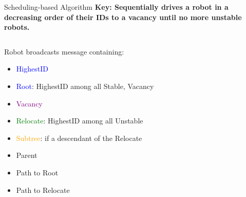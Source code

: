 \begin{frame}{Scheduling-based Algorithm}
  \textbf{\small{Key: Sequentially drives a robot in a decreasing order of their IDs to a vacancy until no more unstable robots.}}
  \begin{columns}[T] %
    \begin{column}{.5\textwidth}
      \small{
        Robot broadcasts message containing:
        \begin{itemize}
        \item \textcolor{blue}{HighestID} 
        \item \textcolor{blue}{Root}: HighestID among all Stable, Vacancy
        \item \textcolor{purple}{Vacancy}
        \item \textcolor{green}{Relocate}: HighestID among all Unstable 
        \item \textcolor{orange}{Subtree}: if a descendant of the Relocate
        \item Parent 
        \item Path to Root
        \item Path to Relocate
        \end{itemize}
      }
    \end{column}%
    \begin{column}{.4\textwidth}
      
    \end{column}%
  \end{columns}
\end{frame}